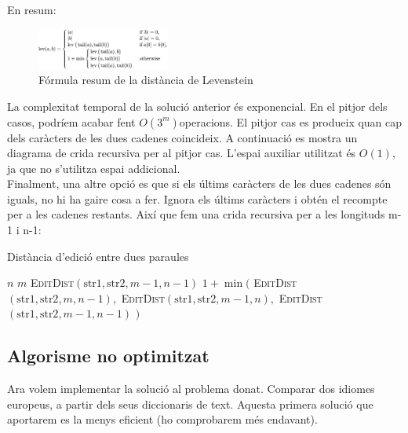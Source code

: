 \documentclass[conference]{IEEEtran}
\begin{document}
    En resum:
    \begin{figure}[ht]
    \centering
    \includegraphics[width=0.388\textwidth]{images/formula3.png}
    \caption{Fórmula resum de la distància de Levenstein}
\end{figure}
    La complexitat temporal de la solució anterior és exponencial. En el pitjor dels casos, podríem acabar fent $O(3^m)$operacions. El pitjor cas es produeix quan cap dels caràcters de les dues cadenes coincideix. A continuació es mostra un diagrama de crida recursiva per al pitjor cas.
    L'espai auxiliar utilitzat és $O(1)$, ja que no s'utilitza espai addicional.\\
    Finalment, una altre opció es que si els últims caràcters de les dues cadenes són iguals, no hi ha gaire cosa a fer. Ignora els últims caràcters i obtén el recompte per a les cadenes restants. Així que fem una crida recursiva per a les longituds m-1 i n-1:
    \begin{algorithm}
        \caption{Distància d'edició entre dues paraules}
    
    \begin{algorithmic}
            \State \Return $n$
        \EndIf
            \State \Return $m$
        \EndIf
            \State \Return \textsc{EditDist}$(\textrm{str1}, \textrm{str2}, m - 1, n - 1)$
        \EndIf
        \State \Return $1 + \min($
        \State \hspace{2em} \textsc{EditDist}$(\textrm{str1}, \textrm{str2}, m, n - 1),$ 
        \State \hspace{2em} \textsc{EditDist}$(\textrm{str1}, \textrm{str2}, m - 1, n),$ 
        \State \hspace{2em} \textsc{EditDist}$(\textrm{str1}, \textrm{str2}, m - 1, n - 1)$ 
        \State $)$
        \EndFunction
    \end{algorithmic}
\end{algorithm}
 \subsection{Algorisme no optimitzat}
 Ara volem implementar la solució al problema donat. Comparar dos idiomes europeus, a partir dels seus diccionaris de text. Aquesta primera solució que aportarem es la menys eficient (ho comprobarem més endavant).\\
 
\end{document}
